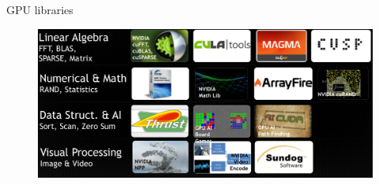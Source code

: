 \documentclass[10pt,times]{beamer}
\begin{document}
\begin{frame}{GPU libraries}

\begin{figure}
\includegraphics[width=.7\linewidth]{figs/GPU_libraries}
\end{figure}

\end{frame}
\end{document}
